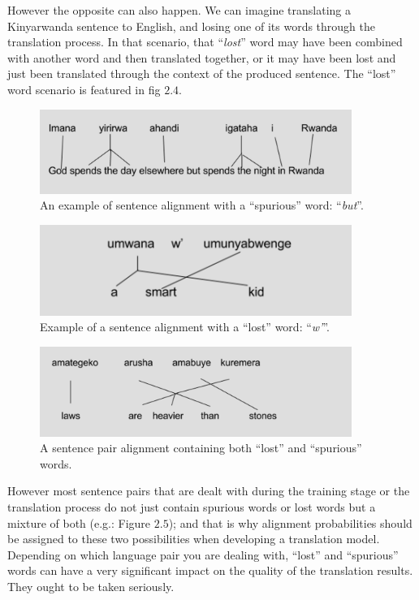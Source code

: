 However the opposite can also happen. We can imagine translating a Kinyarwanda sentence to English, and losing one of its words through the translation process. In that scenario, that ``\textit{lost}'' word may have been combined with another word and then translated together, or it may have been lost and just been translated through the context of the produced sentence. The ``lost'' word scenario is featured in fig $2.4$.

\begin{figure}[h]
\begin{center}
\includegraphics[width=4in]{figures/fig-one.png}
\caption{An example of sentence alignment with a ``spurious'' word: ``\textit{but}''.}
\end{center}
\end{figure}
\begin{figure}[h]
\begin{center}
\includegraphics[width=4in]{figures/fig-two.png}
\caption{Example of a sentence alignment with a ``lost'' word: ``\textit{w'}''.}
\end{center}
\end{figure}
\begin{figure}[h]
\begin{center}
\includegraphics[width=4in]{figures/fig-three.png}
\caption{A sentence pair alignment containing both ``lost'' and ``spurious'' words.}
\end{center}
\end{figure}

However most sentence pairs that are dealt with during the training stage or the translation process do not just contain spurious words or lost words but a mixture of both (e.g.: Figure $2.5$); and that is why alignment probabilities should be assigned to these two possibilities when developing a translation model.  Depending on which language pair you are dealing with, ``lost'' and ``spurious'' words can have a very significant impact on the quality of the translation results. They ought to be taken seriously. 

